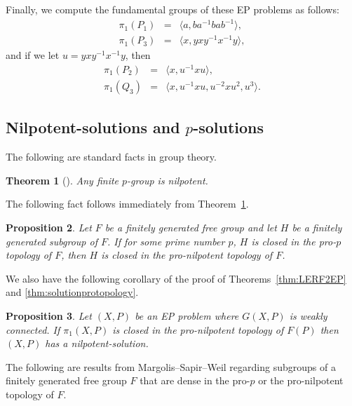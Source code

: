 \documentclass[10pt,a4paper]{amsart}
\newtheorem{theorem}{Theorem}[section]
\newtheorem{proposition}[theorem]{Proposition}
\theoremstyle{definition}
\theoremstyle{definition}
\numberwithin{equation}{section}
\begin{document}
Finally, we compute the fundamental groups of these EP problems as follows:
$$\begin{array}{rcl} \pi_1(P_1)&=&\langle a, ba^{-1}bab^{-1}\rangle, \\
\pi_1(P_3)&=&\langle x, yxy^{-1}x^{-1}y\rangle,
\end{array}
$$
and if we let $u=yxy^{-1}x^{-1}y$, then
$$\begin{array}{rcl}
\pi_1(P_2)&=&\langle x, u^{-1}xu\rangle, \\
\pi_1(Q_3)&=&\langle x, u^{-1}xu, u^{-2}xu^2, u^3\rangle.
\end{array}
$$



\subsection{Nilpotent-solutions and $p$-solutions\label{subsec:nilsolution}}

The following are standard facts in group theory. 

\begin{theorem}[{\cite[5.1.3]{RobinsonBook}}]\label{thm:pnil} Any finite $p$-group is nilpotent.
\end{theorem}


The following fact follows immediately from Theorem~\ref{thm:pnil}.

\begin{proposition} Let $F$ be a finitely generated free group and let $H$ be a finitely generated subgroup of $F$. If for some prime number $p$, $H$ is closed in the pro-$p$ topology of $F$, then $H$ is closed in the pro-nilpotent topology of $F$.
\end{proposition}

We also have the following corollary of the proof of Theorems~\ref{thm:LERF2EP} and \ref{thm:solutionprotopology}.

\begin{proposition}\label{prop:pronil} Let $(X, P)$ be an EP problem where $G(X, P)$ is weakly connected. If $\pi_1(X,P)$ is closed in the pro-nilpotent topology of $F(P)$ then $(X, P)$ has a nilpotent-solution.
\end{proposition}

The following are results from Margolis--Sapir--Weil \cite{MSW01} regarding subgroups of a finitely generated free group $F$ that are dense in the pro-$p$ or the pro-nilpotent topology of $F$. 
\end{document}
